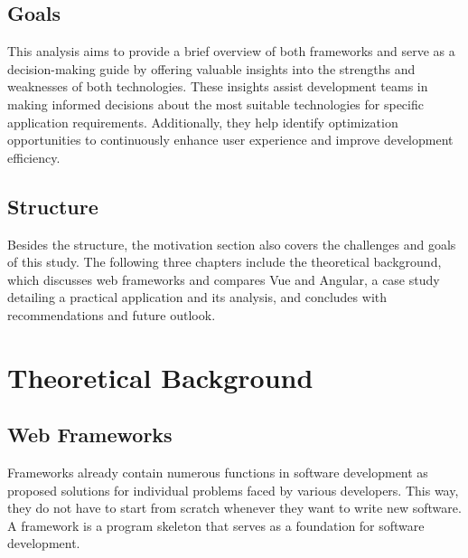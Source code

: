 \documentclass[conference]{IEEEtran}
\begin{document}
\subsection{Goals}
This analysis aims to provide a brief overview of both frameworks and serve as a decision-making guide by offering valuable insights into the strengths and weaknesses of both technologies. 
These insights assist development teams in making informed decisions about the most suitable technologies for specific application requirements. Additionally, they help identify optimization opportunities to continuously enhance user experience and improve development efficiency.
\newline
\subsection{Structure}
Besides the structure, the motivation section also covers the challenges and goals of this study. The following three chapters include the theoretical background, which discusses web frameworks and compares Vue and Angular, a case study detailing a practical application and its analysis, and concludes with recommendations and future outlook.
\newline
\section{Theoretical Background}

\subsection{Web Frameworks}

Frameworks already contain numerous functions in software development as proposed solutions for individual problems faced by various developers. This way, they do not have to start from scratch whenever they want to write new software. A framework is a program skeleton that serves as a foundation for software development.
\end{document}
